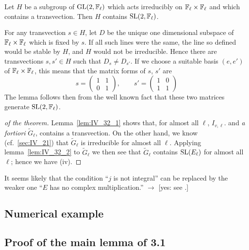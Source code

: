 \begin{lem}\label{lem:IV_32_2}
	Let $H$ be a subgroup of $\operatorname{GL}(2, \mathbb{F}_\ell)$ which acts irreducibly on
	$\mathbb{F}_\ell\times\mathbb{F}_\ell$ and which contains a transvection. Then $H$
	contains $\operatorname{SL}(2, \mathbb{F}_\ell)$.
\end{lem}

For any transvection $s \in H$, let $D$ be the unique one dimensional subspace
of $\mathbb{F}_\ell\times\mathbb{F}_\ell$ which is fixed by $s$. If all such lines were the
same, the line so defined would be stable by $H$, and $H$ would not be
irreducible. Hence there are transvections $s, s' \in H$ such that $D_s \ne
D_{s'}$. If we choose a suitable basis $(e,e')$ of $\mathbb{F}_\ell\times\mathbb{F}_\ell$, this
means that the matrix forms of $s$, $s'$ are
\[
	s =
	\begin{pmatrix}
		1 & 1 \\
		0 & 1
	\end{pmatrix}, \qquad s' = 
	\begin{pmatrix}
		1 & 0 \\
		1 & 1
	\end{pmatrix} 
\]
The lemma follows then from the well known fact that these two matrices
generate $\operatorname{SL}(2, \mathbb{F}_\ell)$.

\begin{proof}[ of the theorem]
	Lemma~\ref{lem:IV_32_1} shows that, for almost all $\ell$, $I_{v,
	\ell}$.  and \emph{a fortiori} $\widetilde{G}_\ell$, contains a
	transvection. On the other hand, we know (cf.\ \ref{sec:IV_21}) that
	$\widetilde{G}_\ell$ is irreducible for almost all $\ell$. Applying
	lemma~\ref{lem:IV_32_2} to $\widetilde{G}_\ell$ we then see that
	$\widetilde{G}_\ell$ contains $\operatorname{SL}(E_\ell)$ for almost all $\ell$;
	hence we have (iv).
\end{proof}

\begin{obs}
	It seems likely that the condition ``$j$ is not integral'' can be
	replaced by the weaker one ``$E$ has no complex multiplication.''
	$\to$ [yes: see \cite{76}.]
\end{obs}

\subsection{Numerical example}
\label{sec:IV_33}

\subsection{Proof of the main lemma of 3.1}
\label{sec:IV_34}

